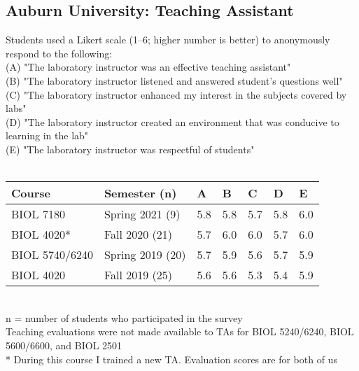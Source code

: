 \documentclass[11pt,a4paper,sans]{moderncv}        %
\begin{document}
\subsection{Auburn University: Teaching Assistant}
{Students used a Likert scale (1–6; higher number is better) to anonymously respond to the following:\\ (A) "The laboratory instructor was an effective teaching assistant"\\(B) "The laboratory instructor listened and answered student’s questions well"\\(C) "The laboratory instructor enhanced my interest in the subjects covered by labs"\\(D) "The laboratory instructor created an environment that was conducive to learning in the lab" \\ (E) "The laboratory instructor was respectful of students" }\\ \\
\begin{tabular}{ p{3cm}p{3cm}p{1.5cm}p{1.5cm}p{1.5cm}p{1.5cm}p{1.5cm}  }
 \hline
Course & Semester (n) & A & B & C & D & E \\
 \hline
 BIOL 7180 & Spring 2021 (9) & 5.8 & 5.8 & 5.7 & 5.8 & 6.0 \\
 BIOL 4020* & Fall 2020 (21) & 5.7 & 6.0 & 6.0 & 5.7 & 6.0 \\
 BIOL 5740/6240 & Spring 2019 (20)  & 5.7    & 5.9 & 5.6 & 5.7 & 5.9 \\
 BIOL 4020 & Fall 2019 (25)  & 5.6    & 5.6 & 5.3 & 5.4 & 5.9  \\
 \hline
\end{tabular} \\
{\tiny{n = number of students who participated in the survey}} \\
 {\tiny{Teaching evaluations were not made available to TAs for BIOL 5240/6240, BIOL 5600/6600, and BIOL 2501}} \\
 {\tiny{* During this course I trained a new TA. Evaluation scores are for both of us}} \par
\end{document}
